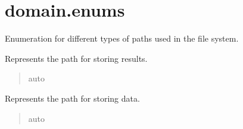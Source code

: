 \documentclass[letterpaper,10pt,english]{sphinxmanual}
\begin{document}
\section{domain.enums}
\label{\detokenize{modules:module-domain.enums.PathKey}}\label{\detokenize{modules:domain-enums}}

\begin{fulllineitems}
\label{\detokenize{modules:domain.enums.PathKey.PathKey}}
\pysigstartsignatures
{}
\pysigstopsignatures
\sphinxAtStartPar
Enumeration for different types of paths used in the file system.

\begin{fulllineitems}
\label{\detokenize{modules:domain.enums.PathKey.PathKey.RESULTS}}
\pysigstartsignatures
{}
\pysigstopsignatures
\sphinxAtStartPar
Represents the path for storing results.
\begin{quote}\begin{description}
\sphinxAtStartPar
auto

\end{description}\end{quote}

\end{fulllineitems}


\begin{fulllineitems}
\label{\detokenize{modules:domain.enums.PathKey.PathKey.DATA}}
\pysigstartsignatures
{}
\pysigstopsignatures
\sphinxAtStartPar
Represents the path for storing data.
\begin{quote}\begin{description}
\sphinxAtStartPar
auto


\end{description}
\end{quote}
\end{fulllineitems}
\end{fulllineitems}
\end{document}
